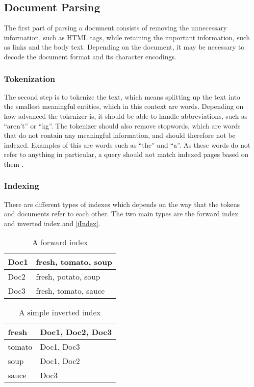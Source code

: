 \subsection{Document Parsing}
The first part of parsing a document consists of removing the unnecessary
information, such as HTML tags, while retaining the important information, such
as links and the body text. Depending on the document, it may be necessary to
decode the document format and its character encodings.

\subsubsection{Tokenization}
The second step is to tokenize the text, which means splitting up the text into
the smallest meaningful entities, which in this context are words. Depending on
how advanced the tokenizer is, it should be able to handle abbreviations,
such as ``aren't'' or ``kg''. The tokenizer should also remove stopwords,
which are words that do not contain any meaningful information,
and should therefore not be indexed. Examples of this are words such as ``the''
and ``a''.
As these words do not refer to anything in particular, a query should not match
indexed pages based on them \citep[Ch.
2]{manning2008introduction}.

\subsubsection{Indexing}
There are different types of indexes which depends on the way that the tokens
and documents refer to each other. The two main types are the forward index and
inverted index and \autoref{iIndex}.

\begin{minipage}{.40\textwidth}
  \centering
  \begin{table}[H]
	\centering
    \label{fIndex}
    \begin{tabular}{|l|l|}
\hline
Doc1 & fresh, tomato, soup \\ \hline
Doc2 & fresh, potato, soup \\ \hline
Doc3 & fresh, tomato, sauce \\ \hline
	\end{tabular}
	\caption{A forward index}
  \end{table}
\end{minipage}
\begin{minipage}{0.5\textwidth}
  \centering
  \begin{table}[H]
	\centering
    \label{iIndex}
    \begin{tabular}{|l|l|}
\hline
fresh & Doc1, Doc2, Doc3 \\ \hline
tomato & Doc1, Doc3 \\ \hline
soup & Doc1, Doc2 \\ \hline
sauce & Doc3 \\ \hline
	\end{tabular}
	\caption{A simple inverted index}
  \end{table}  
\end{minipage}

